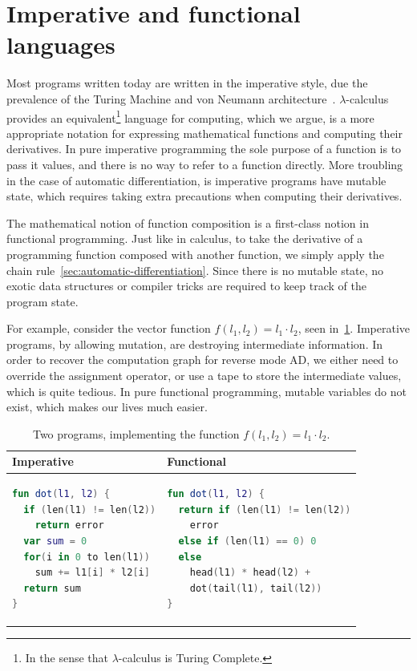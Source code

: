 \documentclass[12pt,initial,twoside,maitrise]{dms}
\numberwithin{equation}{section}
\numberwithin{table}{chapter}
\numberwithin{figure}{chapter}
\begin{document}
\section{Imperative and functional languages}

Most programs written today are written in the imperative style, due the prevalence of the Turing Machine and von Neumann architecture~\cite{backus2007can}. $\lambda$-calculus provides an equivalent\footnote{In the sense that $\lambda$-calculus is Turing Complete.} language for computing, which we argue, is a more appropriate notation for expressing mathematical functions and computing their derivatives. In pure imperative programming the sole purpose of a function is to pass it values, and there is no way to refer to a function directly. More troubling in the case of automatic differentiation, is imperative programs have mutable state, which requires taking extra precautions when computing their derivatives.

The mathematical notion of function composition is a first-class notion in functional programming. Just like in calculus, to take the derivative of a programming function composed with another function, we simply apply the chain rule~\ref{sec:automatic-differentiation}. Since there is no mutable state, no exotic data structures or compiler tricks are required to keep track of the program state.

For example, consider the vector function $f(l_1, l_2) = l_1 \cdot l_2$, seen in~\ref{tab:1}. Imperative programs, by allowing mutation, are destroying intermediate information. In order to recover the computation graph for reverse mode AD, we either need to override the assignment operator, or use a tape to store the intermediate values, which is quite tedious. In pure functional programming, mutable variables do not exist, which makes our lives much easier.

\begin{table}[t]
    \centering
    \begin{tabular}{|l|l|}
        \hline
        Imperative & Functional \\
        \hline
        \begin{lstlisting}[language=Kotlin, linewidth=5.5cm]
fun dot(l1, l2) {
  if (len(l1) != len(l2))
    return error
  var sum = 0
  for(i in 0 to len(l1))
    sum += l1[i] * l2[i]
  return sum
}
        \end{lstlisting}
         &
        {\begin{lstlisting}[language=Kotlin, linewidth=5.5cm, numbers=none]
fun dot(l1, l2) {
  return if (len(l1) != len(l2))
    error
  else if (len(l1) == 0) 0
  else
    head(l1) * head(l2) +
    dot(tail(l1), tail(l2))
}
        \end{lstlisting}}
        \\
        \hline
    \end{tabular}
    \caption{Two programs, implementing the function $f(l_1, l_2) = l_1 \cdot l_2$.}
    \label{tab:1}
\end{table}
\end{document}
